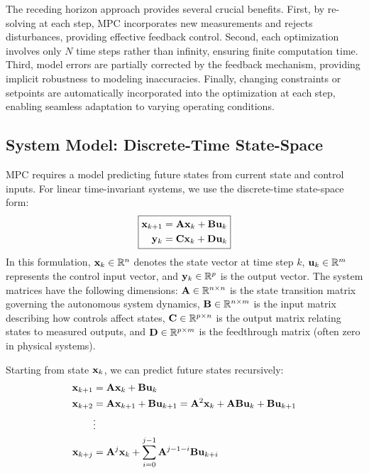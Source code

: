 The receding horizon approach provides several crucial benefits. First, by re-solving at each step, MPC incorporates new measurements and rejects disturbances, providing effective feedback control. Second, each optimization involves only $N$ time steps rather than infinity, ensuring finite computation time. Third, model errors are partially corrected by the feedback mechanism, providing implicit robustness to modeling inaccuracies. Finally, changing constraints or setpoints are automatically incorporated into the optimization at each step, enabling seamless adaptation to varying operating conditions.

\subsection{System Model: Discrete-Time State-Space}

MPC requires a model predicting future states from current state and control inputs. For linear time-invariant systems, we use the discrete-time state-space form:
\begin{equation}
\boxed{
\begin{aligned}
    \mathbf{x}_{k+1} &= \mathbf{A}\mathbf{x}_k + \mathbf{B}\mathbf{u}_k \\
    \mathbf{y}_k &= \mathbf{C}\mathbf{x}_k + \mathbf{D}\mathbf{u}_k
\end{aligned}
}
\label{eq:discrete_ss}
\end{equation}
In this formulation, $\mathbf{x}_k \in \mathbb{R}^n$ denotes the state vector at time step $k$, $\mathbf{u}_k \in \mathbb{R}^m$ represents the control input vector, and $\mathbf{y}_k \in \mathbb{R}^p$ is the output vector. The system matrices have the following dimensions: $\mathbf{A} \in \mathbb{R}^{n \times n}$ is the state transition matrix governing the autonomous system dynamics, $\mathbf{B} \in \mathbb{R}^{n \times m}$ is the input matrix describing how controls affect states, $\mathbf{C} \in \mathbb{R}^{p \times n}$ is the output matrix relating states to measured outputs, and $\mathbf{D} \in \mathbb{R}^{p \times m}$ is the feedthrough matrix (often zero in physical systems).

Starting from state $\mathbf{x}_k$, we can predict future states recursively:
\begin{align}
    \mathbf{x}_{k+1} &= \mathbf{A}\mathbf{x}_k + \mathbf{B}\mathbf{u}_k \label{eq:pred1}\\
    \mathbf{x}_{k+2} &= \mathbf{A}\mathbf{x}_{k+1} + \mathbf{B}\mathbf{u}_{k+1} = \mathbf{A}^2\mathbf{x}_k + \mathbf{A}\mathbf{B}\mathbf{u}_k + \mathbf{B}\mathbf{u}_{k+1} \label{eq:pred2}\\
    &\vdots \nonumber \\
    \mathbf{x}_{k+j} &= \mathbf{A}^j\mathbf{x}_k + \sum_{i=0}^{j-1} \mathbf{A}^{j-1-i}\mathbf{B}\mathbf{u}_{k+i} \label{eq:predj}
\end{align}

